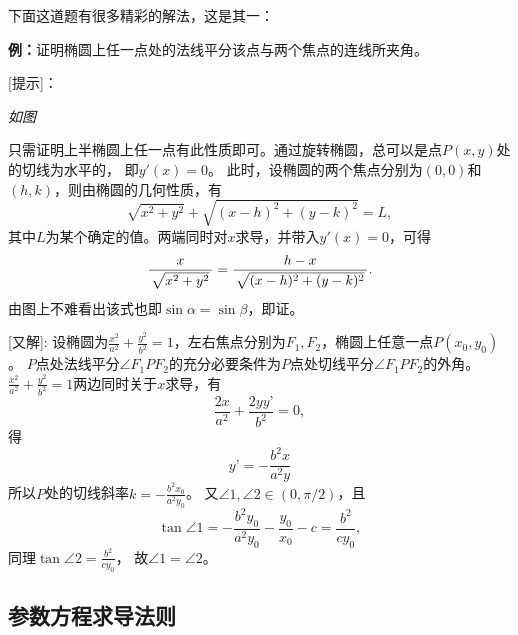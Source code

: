 \begin{shaded}
	下面这道题有很多精彩的解法，这是其一：
	
	{\bf 例：}证明椭圆上任一点处的法线平分该点与两个焦点的连线所夹角。

	[提示]：{\it 如图
	\begin{center}
	\end{center}
	只需证明上半椭圆上任一点有此性质即可。通过旋转椭圆，总可以是点$P(x,y)$处的切线为水平的，
	即$y'(x)=0$。
	此时，设椭圆的两个焦点分别为$(0,0)$和$(h,k)$，则由椭圆的几何性质，有
	$$\sqrt{x^2+y^2}+\sqrt{(x-h)^2+(y-k)^2}=L,$$
	其中$L$为某个确定的值。两端同时对$x$求导，并带入$y'(x)=0$，可得
	$$\displaystyle\frac{\,{x}\,}{\,{\sqrt{x^2+y^2}}\,}=\displaystyle\frac{\,{h-x}\,}{\,{\sqrt{(x-h)^2+(y-k)^2}}\,}.$$
	由图上不难看出该式也即$\sin\alpha=\sin\beta$，即证。}
		
[又解]:
设椭圆为$\frac{x^2}{a^2}+\frac{y^2}{b^2}=1$，左右焦点分别为$F_1,F_2$，椭圆上任意一点$P(x_0,y_0)$。
$P$点处法线平分$\angle F_1PF_2$的充分必要条件为$P$点处切线平分$\angle F_1PF_2$的外角。
$\frac{x^2}{a^2}+\frac{y^2}{b^2}=1$两边同时关于$x$求导，有
$$\frac{2x}{a^2}+\frac{2yy’}{b^2}=0,$$
得
$$y’=-\frac{b^2x}{a^2y}$$
所以$P$处的切线斜率$k=-\frac{b^2x_0}{a^2y_0}$。
又$\angle 1,\angle 2\in(0,\pi/2)$，且
$$\tan\angle 1=-\frac{b^2y_0}{a^2y_0}-\frac{y_0}{x_0}-c=\frac{b^2}{cy_0},$$
同理$\tan\angle 2= \frac{b^2}{cy_0}$，
故$\angle 1=\angle 2$。

\end{shaded}

\subsection{参数方程求导法则}

